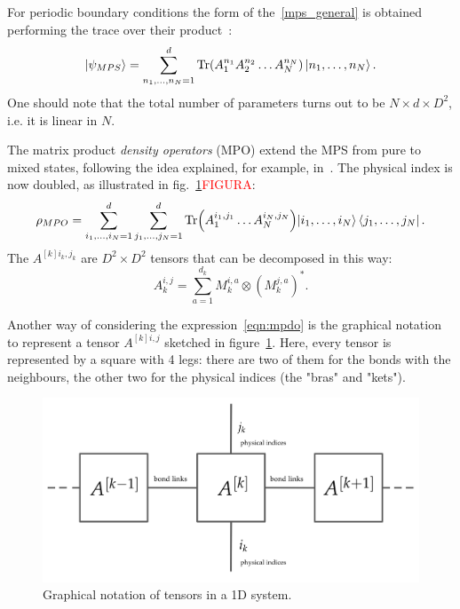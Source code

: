 For periodic boundary conditions the form of the~\ref{mps_general} is obtained performing the trace over their product~\cite{SCHOLLWOCK201196, PhysRevLett.93.207204}:
\begin{equation}
    \ket{\psi_{MPS}} = \sum_{n_1,\dots,n_N=1}^{d} \operatorname{Tr}(A_1^{n_1}A_2^{n_2}\dots A_N^{n_N}) \ket{n_1,\dots,n_N}.
\end{equation}
One should note that the total number of parameters turns out to be $N \times d \times D^2$, i.e. it is linear in $N$.

The matrix product \emph{density operators} (MPO) extend the MPS from pure to mixed states, following the idea explained, for example, in~\cite{PhysRevLett.93.207204}. The physical index is now doubled, as illustrated in fig.~\ref{fig:tensor_network}\textcolor{red}{FIGURA}:
\begin{equation}
\label{eqn:mpdo}
    \rho_{MPO} = \sum_{i_1, \dots ,i_N = 1}^{d} \sum_{j_1, \dots ,j_N = 1}^{d} \operatorname{Tr}\Bigl(A_1^{i_1,j_1} \dots A_N^{i_N,j_N}\Bigl) \ket{i_1, \dots ,i_N}\bra{j_1, \dots ,j_N}.
\end{equation}
The $A^{[k]i_k,j_k}$ are $D^2 \times D^2$ tensors that can be decomposed in this way:
\begin{equation*}
    A_k^{i,j} = \sum_{a = 1}^{d_k} M_k^{i,a} \otimes (M_k^{j,a})^*.
\end{equation*}

Another way of considering the expression~\ref{eqn:mpdo} is the graphical notation to represent a tensor $A^{[k] i,j}$ sketched in figure~\ref{fig:tensor_network}. Here, every tensor is represented by a square with 4 legs: there are two of them for the bonds with the neighbours, the other two for the physical indices (the "bras" and "kets"). 

\begin{figure}[H]
    \centering
    \includegraphics[scale=0.30]{Figures/tensor_network.png}
    \caption{Graphical notation of tensors in a 1D system.}
    \label{fig:tensor_network}
\end{figure}

